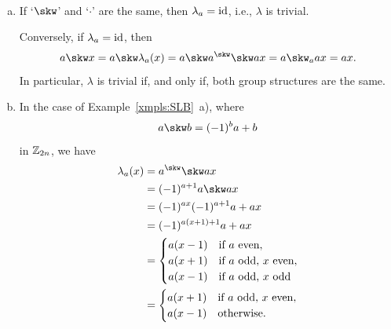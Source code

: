 \begin{xmpls}\label{xmpls:lambda}${}$
    \begin{enumerate}[a),font=\upshape]
        \item If `$\skw$' and `$\cdot$' are the same, then $\lambda_a=\operatorname{id}$, i.e., $\lambda$ is trivial. 
        
        Conversely, if $\lambda_a=\operatorname{id}$, then
        $$
            a\skw x = a\skw\lambda_a(x)
                = a\skw a^\skw\skw ax
                = a\skw_a ax
                = ax.
        $$
        In particular, $\lambda$ is trivial if, and only if, both group structures are the same.

        \item In the case of Example~\ref{xmpls:SLB}~a), where
        $$
            a\skw b = (-1)^ba + b
        $$
        in $\mathbb{Z}_{2n}$, we have
        \begin{align*}
            \lambda_a(x) &= a^\skw\skw ax\\
                &= (-1)^{a+1}a\skw ax\\
                &= (-1)^{ax}(-1)^{a+1}a + ax\\
                &= (-1)^{a(x+1)+1}a+ax\\
                &= \begin{cases}
                    a(x-1)  &\text{if $a$ even},\\
                    a(x+1) &\text{if $a$ odd, $x$ even},\\
                    a(x-1) &\text{if $a$ odd, $x$ odd}
                \end{cases}\\
                &= \begin{cases}
                    a(x+1) &\text{if $a$ odd, $x$ even},\\
                    a(x-1) &\text{otherwise}.
                \end{cases}
        \end{align*}


\end{enumerate}
\end{xmpls}
